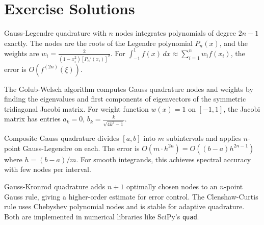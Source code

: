 \section{Exercise Solutions}

\begin{solution}
Gauss-Legendre quadrature with $n$ nodes integrates polynomials of degree $2n-1$ exactly. The nodes are the roots of the Legendre polynomial $P_n(x)$, and the weights are $w_i = \frac{2}{(1-x_i^2)[P_n'(x_i)]^2}$. For $\int_{-1}^{1} f(x)\,dx \approx \sum_{i=1}^n w_i f(x_i)$, the error is $O(f^{(2n)}(\xi))$.
\end{solution}

\begin{solution}
The Golub-Welsch algorithm computes Gauss quadrature nodes and weights by finding the eigenvalues and first components of eigenvectors of the symmetric tridiagonal Jacobi matrix. For weight function $w(x) = 1$ on $[-1,1]$, the Jacobi matrix has entries $a_k = 0$, $b_k = \frac{k}{\sqrt{4k^2-1}}$.
\end{solution}

\begin{solution}
Composite Gauss quadrature divides $[a,b]$ into $m$ subintervals and applies $n$-point Gauss-Legendre on each. The error is $O(m \cdot h^{2n}) = O((b-a)h^{2n-1})$ where $h = (b-a)/m$. For smooth integrands, this achieves spectral accuracy with few nodes per interval.
\end{solution}

\begin{solution}
Gauss-Kronrod quadrature adds $n+1$ optimally chosen nodes to an $n$-point Gauss rule, giving a higher-order estimate for error control. The Clenshaw-Curtis rule uses Chebyshev polynomial nodes and is stable for adaptive quadrature. Both are implemented in numerical libraries like SciPy's \texttt{quad}.
\end{solution}
